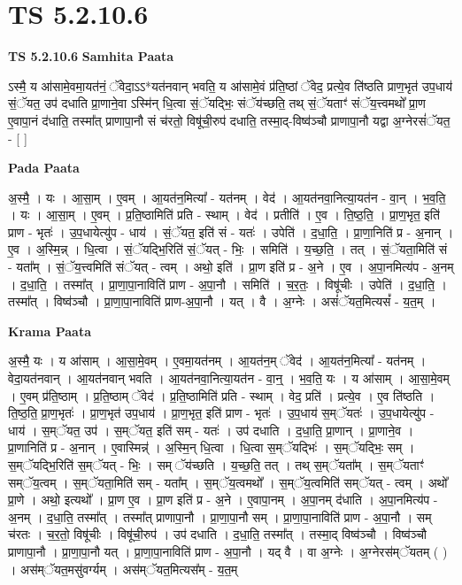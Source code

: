 \documentclass[17pt]{extarticle}
\begin{document}
\section{ TS 5.2.10.6 }

\textbf{TS 5.2.10.6 } \newline
\textbf{Samhita Paata} \newline

ऽस्मै॒ य आ॑सामे॒वमा॒यत॑नं॒ ॅवेदा॒ऽऽ*यत॑नवान् भवति॒ य आ॑सामे॒वं प्र॑ति॒ष्ठां ॅवेद॒ प्रत्ये॒व ति॑ष्ठति प्राण॒भृत॑ उप॒धाय॑ सं॒ॅयत॒ उप॑ दधाति प्रा॒णाने॒वा ऽस्मि॑न् धि॒त्वा सं॒ॅयद्भिः॒ संॅय॑च्छति॒ तथ् सं॒ॅयताꣳ॑ संॅय॒त्त्वमथो᳚ प्रा॒ण ए॒वापा॒नं द॑धाति॒ तस्मा᳚त् प्राणापा॒नौ सं च॑रतो॒ विषू॑ची॒रुप॑ दधाति॒ तस्मा॒द्-विष्व॑ञ्चौ प्राणापा॒नौ यद्वा अ॒ग्नेरसं॑ॅयत॒ - [  ] \newline

\textbf{Pada Paata} \newline

अ॒स्मै॒ । यः । आ॒सा॒म् । ए॒वम् । आ॒यत॑न॒मित्या᳚ - यत॑नम् । वेद॑ । आ॒यत॑नवा॒नित्या॒यत॑न - वा॒न् । भ॒व॒ति॒ । यः । आ॒सा॒म् । ए॒वम् । प्र॒ति॒ष्ठामिति॑ प्रति - स्थाम् । वेद॑ । प्रतीति॑ । ए॒व । ति॒ष्ठ॒ति॒ । प्रा॒ण॒भृत॒ इति॑ प्राण - भृतः॑ । उ॒प॒धायेत्यु॑प - धाय॑ । सं॒ॅयत॒ इति॑ सं - यतः॑ । उपेति॑ । द॒धा॒ति॒ । प्रा॒णा॒निति॑ प्र - अ॒नान् । ए॒व । अ॒स्मि॒न्न् । धि॒त्वा । सं॒ॅयद्भि॒रिति॑ सं॒ॅयत् - भिः॒ । समिति॑ । य॒च्छ॒ति॒ । तत् । सं॒ॅयता॒मिति॑ सं - यता᳚म् । सं॒ॅय॒त्त्वमिति॑ संॅयत् - त्वम् । अथो॒ इति॑ । प्रा॒ण इति॑ प्र - अ॒ने । ए॒व । अ॒पा॒नमित्य॑प - अ॒नम् । द॒धा॒ति॒ । तस्मा᳚त् । प्रा॒णा॒पा॒नाविति॑ प्राण - अ॒पा॒नौ । समिति॑ । च॒र॒तः॒ । विषू॑चीः । उपेति॑ । द॒धा॒ति॒ । तस्मा᳚त् । विष्व॑ञ्चौ । प्रा॒णा॒पा॒नाविति॑ प्राण-अ॒पा॒नौ । यत् । वै । अ॒ग्नेः । असं॑ॅयत॒मित्यसं᳚ - य॒त॒म् ।  \newline


\textbf{Krama Paata} \newline

अ॒स्मै॒ यः । य आ॑साम् । आ॒सा॒मे॒वम् । ए॒वमा॒यत॑नम् । आ॒यत॑न॒म् ॅवेद॑ । आ॒यत॑न॒मित्या᳚ - यत॑नम् । वेदा॒यत॑नवान् । आ॒यत॑नवान् भवति । आ॒यत॑नवा॒नित्या॒यत॑न - वा॒न्॒ । भ॒व॒ति॒ यः । य आ॑साम् । आ॒सा॒मे॒वम् । ए॒वम् प्र॑ति॒ष्ठाम् । प्र॒ति॒ष्ठाम् ॅवेद॑ । प्र॒ति॒ष्ठामिति॑ प्रति - स्थाम् । वेद॒ प्रति॑ । प्रत्ये॒व । ए॒व ति॑ष्ठति । ति॒ष्ठ॒ति॒ प्रा॒ण॒भृतः॑ । प्रा॒ण॒भृत॑ उप॒धाय॑ । प्रा॒ण॒भृत॒ इति॑ प्राण - भृतः॑ । उ॒प॒धाय॑ स॒म्ॅयतः॑ । उ॒प॒धायेत्यु॑प - धाय॑ । स॒म्ॅयत॒ उप॑ । स॒म्ॅयत॒ इति॑ सम् - यतः॑ । उप॑ दधाति । द॒धा॒ति॒ प्रा॒णान् । प्रा॒णाने॒व । प्रा॒णानिति॑ प्र - अ॒नान् । ए॒वास्मिन्न्॑ । अ॒स्मि॒न् धि॒त्वा । धि॒त्वा स॒म्ॅयद्भिः॑ । स॒म्ॅयद्भिः॒ सम् । स॒म्ॅयद्भि॒रिति॑ स॒म्ॅयत् - भिः॒ । सम् ॅय॑च्छति । य॒च्छ॒ति॒ तत् । तथ् स॒म्ॅयता᳚म् । स॒म्ॅयताꣳ॑ सम्ॅय॒त्वम् । स॒म्ॅयता॒मिति॑ सम् - यता᳚म् । स॒म्ॅय॒त्वमथो᳚ । स॒म्ॅय॒त्वमिति॑ सम्ॅयत् - त्वम् । अथो᳚ प्रा॒णे । अथो॒ इत्यथो᳚ । प्रा॒ण ए॒व । प्रा॒ण इति॑ प्र - अ॒ने । ए॒वापा॒नम् । अ॒पा॒नम् द॑धाति । अ॒पा॒नमित्य॑प - अ॒नम् । द॒धा॒ति॒ तस्मा᳚त् । तस्मा᳚त् प्राणापा॒नौ । प्रा॒णा॒पा॒नौ सम् । प्रा॒णा॒पा॒नाविति॑ प्राण - अ॒पा॒नौ । सम् च॑रतः । च॒र॒तो॒ विषू॑चीः । विषू॑ची॒रुप॑ । उप॑ दधाति । द॒धा॒ति॒ तस्मा᳚त् । तस्मा॒द् विष्व॑ञ्चौ । विष्व॑ञ्चौ प्राणापा॒नौ । प्रा॒णा॒पा॒नौ यत् । प्रा॒णा॒पा॒नाविति॑ प्राण - अ॒पा॒नौ । यद् वै । वा अ॒ग्नेः । अ॒ग्नेरस॑म्ॅयतम् ( ) । अस॑म्ॅयत॒मसु॑वर्ग्यम् । अस॑म्ॅयत॒मित्यस᳚म् - य॒त॒म् \newline
\end{document}
